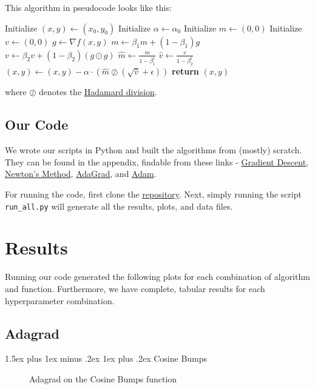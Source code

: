 \documentclass[conference]{IEEEtran}
\makeatletter
\def\subsubsection{\@startsection{subsubsection}{3}{\z@}%
  {1.5ex plus 1ex minus .2ex}%
  {1ex plus .2ex}%
  {\normalfont\normalsize}}
\makeatother
\begin{document}
This algorithm in pseudocode looks like this:

\begin{algorithmic}[1]
    \STATE Initialize $(x,y) \gets (x_0,y_0)$
    \STATE Initialize $\alpha \gets \alpha_0$
    \STATE Initialize $m \gets (0, 0)$
    \STATE Initialize $v \gets (0, 0)$
        \STATE $g \gets \nabla f(x,y)$
        \STATE $m \gets \beta_1 m + (1 - \beta_1)g$
        \STATE $v \gets \beta_2 v + (1 - \beta_2)\left(g \odot g\right)$
        \STATE $\hat{m} \gets \frac{m}{1 - \beta_1^t}$
        \STATE $\hat{v} \gets \frac{v}{1 - \beta_2^t}$
        \STATE $(x,y) \gets (x,y) - \alpha \cdot \left(\hat{m} \oslash \left(\sqrt{\hat{v}} + \epsilon\right)\right)$
    \ENDFOR
    \STATE \textbf{return} $(x,y)$
\end{algorithmic}

where $\oslash$ denotes the \href{https://en.wikipedia.org/wiki/Hadamard_product_(matrices)#Analogous_operations}{Hadamard division}.

\subsection{Our Code}

We wrote our scripts in Python and built the algorithms from (mostly) scratch.
They can be found in the appendix, findable from these links - \hyperref[lst:gradient_descent]{Gradient Descent},
\hyperref[lst:newtons_method]{Newton's Method}, \hyperref[lst:adagrad]{AdaGrad}, and \hyperref[lst:adam]{Adam}.

For running the code, first clone the \href{https://github.com/rlovett992/CSE_620_Fall26_Project1_Robert_John/tree/main}{repository}.
Next, simply running the script \texttt{run\_all.py} will generate all the results, plots, and data files.

\section{Results}
Running our code generated the following plots for each combination of algorithm and function.
Furthermore, we have complete, tabular results for each hyperparameter combination.

\subsection{Adagrad}

\subsubsection{Cosine Bumps}
\begin{figure}[H]
    \centering
    \caption{Adagrad on the Cosine Bumps function}
    \label{fig:adagrad_cosine}
\end{figure}
\end{document}
